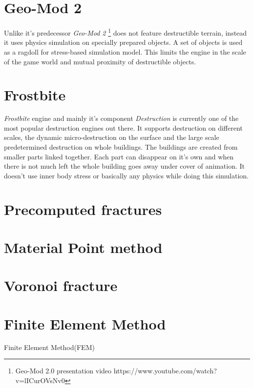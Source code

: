 \section{Geo-Mod 2}
Unlike it's predecessor \emph{Geo-Mod 2} \cite{geomod}\footnote{Geo-Mod 2.0 presentation video https://www.youtube.com/watch?v=lICurOVsNv0} does not feature destructible terrain, instead it uses physics simulation on specially prepared objects. A set of objects is used as a ragdoll for stress-based simulation model. This limits the engine in the scale of the game world and mutual proximity of destructible objects.

\section{Frostbite}
\emph{Frostbite} \cite{frostbite} engine and mainly it's component \emph{Destruction} \cite{destruction} is currently one of the most popular destruction engines out there. It supports destruction on different scales, the dynamic micro-destruction on the surface and the large scale predetermined destruction on whole buildings. The buildings are created from smaller parts linked together. Each part can disappear on it's own and when there is not much left the whole building goes away under cover of animation. 
It doesn't use inner body stress or basically any physics while doing this simulation.

\section{Precomputed fractures}


\section{Material Point method}

\section{Voronoi fracture}

\section{Finite Element Method}
Finite Element Method(FEM) \cite{brittlefracture,ductilefracture,femingames}

